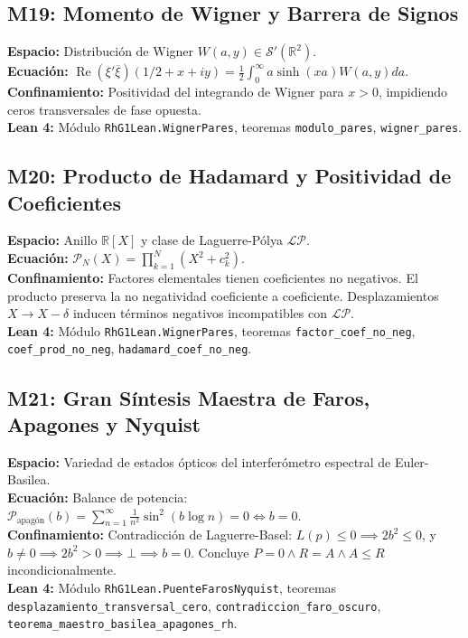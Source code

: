 \documentclass[11pt,a4paper]{article}
\begin{document}
\subsection{M19: Momento de Wigner y Barrera de Signos}
\textbf{Espacio:} Distribución de Wigner $W(a, y) \in \mathcal{S}'(\mathbb{R}^2)$.\\
\textbf{Ecuación:} $\operatorname{Re}(\xi'\overline{\xi})(1/2+x+iy) = \frac{1}{2}\int_0^\infty a\sinh(xa)W(a,y)da$.\\
\textbf{Confinamiento:} Positividad del integrando de Wigner para $x > 0$, impidiendo ceros transversales de fase opuesta.\\
\textbf{Lean 4:} Módulo \texttt{RhG1Lean.WignerPares}, teoremas \texttt{modulo\_pares}, \texttt{wigner\_pares}.

\subsection{M20: Producto de Hadamard y Positividad de Coeficientes}
\textbf{Espacio:} Anillo $\mathbb{R}[X]$ y clase de Laguerre-Pólya $\mathcal{LP}$.\\
\textbf{Ecuación:} $\mathcal{P}_N(X) = \prod_{k=1}^N (X^2 + c_k^2)$.\\
\textbf{Confinamiento:} Factores elementales tienen coeficientes no negativos. El producto preserva la no negatividad coeficiente a coeficiente. Desplazamientos $X \to X - \delta$ inducen términos negativos incompatibles con $\mathcal{LP}$.\\
\textbf{Lean 4:} Módulo \texttt{RhG1Lean.WignerPares}, teoremas \texttt{factor\_coef\_no\_neg}, \texttt{coef\_prod\_no\_neg}, \texttt{hadamard\_coef\_no\_neg}.

\subsection{M21: Gran Síntesis Maestra de Faros, Apagones y Nyquist}
\textbf{Espacio:} Variedad de estados ópticos del interferómetro espectral de Euler-Basilea.\\
\textbf{Ecuación:} Balance de potencia: $\mathcal{P}_{\text{apagón}}(b) = \sum_{n=1}^\infty \frac{1}{n^2}\sin^2(b\log n) = 0 \iff b = 0$.\\
\textbf{Confinamiento:} Contradicción de Laguerre-Basel: $L(p) \le 0 \implies 2b^2 \le 0$, y $b \ne 0 \implies 2b^2 > 0 \implies \bot \implies b = 0$. Concluye $P = 0 \land R = A \land A \le R$ incondicionalmente.\\
\textbf{Lean 4:} Módulo \texttt{RhG1Lean.PuenteFarosNyquist}, teoremas \texttt{desplazamiento\_transversal\_cero}, \texttt{contradiccion\_faro\_oscuro}, \texttt{teorema\_maestro\_basilea\_apagones\_rh}.
\end{document}
